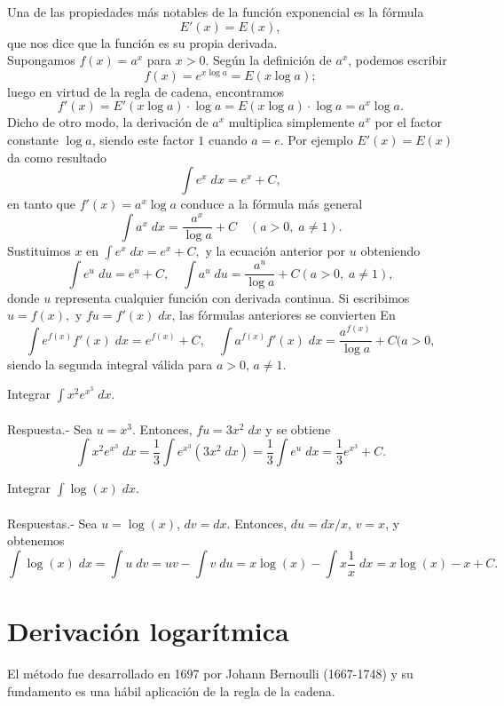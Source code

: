 Una de las propiedades más notables de la función exponencial es la fórmula
$$E'(x)=E(x),$$
que nos dice que la función es su propia derivada. \\

Supongamos $f(x)=a^x$ para $x>0$. Según la definición de $a^x$, podemos escribir
$$f(x)=e^{x\log a}=E(x\log a);$$
luego en virtud de la regla de cadena, encontramos
$$f'(x)=E'(x\log a )\cdot \log a=E(x\log a)\cdot \log a=a^x\log a.$$
Dicho de otro modo, la derivación de $a^x$ multiplica simplemente $a^x$ por el factor constante $\log a$, siendo este factor $1$ cuando $a=e$. Por ejemplo $E'(x)=E(x)$ da como resultado 
$$\int e^x \; dx = e^x+C,$$
en tanto que $f'(x)=a^x\log a$ conduce a la fórmula más general
$$\int a^x \; dx = \dfrac{a^x}{\log a}+C \quad (a>0,\; a\neq 1).$$
Sustituimos $x$ en $\int e^x \; dx = e^x+C,$ y la ecuación anterior por $u$ obteniendo
$$\int e^u \; du = e^u+C, \quad \int a^u \; du = \dfrac{a^u}{\log a}+C (a>0,\; a\neq 1),$$
donde $u$ representa cualquier función con derivada continua. Si escribimos $u=f(x),$ y $fu=f'(x)\; dx$, las fórmulas anteriores se convierten En
$$\int e^{f(x)} f'(x) \; dx = e^{f(x)}+C, \quad \int a^{f(x)} f'(x) \; dx = \dfrac{a^{f(x)}}{\log a}+C (a>0,$$
siendo la segunda integral válida para $a>0$, $a\neq 1$.

\begin{ejem}
    Integrar $\displaystyle\int x^2e^{x^3}\;dx.$\\\\
	Respuesta.-\; Sea $u=x^3$. Entonces, $fu=3x^2\; dx$  y se obtiene
	$$\int x^2e^{x^3}\; dx = \dfrac{1}{3}\int e^{x^3}(3x^2\; dx)=\dfrac{1}{3}\int e^u\; dx = \dfrac{1}{3}e^{x^3}+C.$$
\end{ejem}

\begin{ejem}
    Integrar $\displaystyle\int \log(x)\; dx.$\\\\
	Respuestas.-\; Sea $u=\log(x)$, $dv=dx.$ Entonces, $du=dx/x$, $v=x$, y obtenemos
	$$\int \log(x)\; dx = \int u\; dv = uv-\int v\; du = x\log(x)-\int x\dfrac{1}{x}\; dx = x\log(x)-x+C.$$
\end{ejem}


\section{Derivación logarítmica}
El método fue desarrollado en 1697 por Johann Bernoulli (1667-1748) y su fundamento es una hábil aplicación de la regla de la cadena.\\

